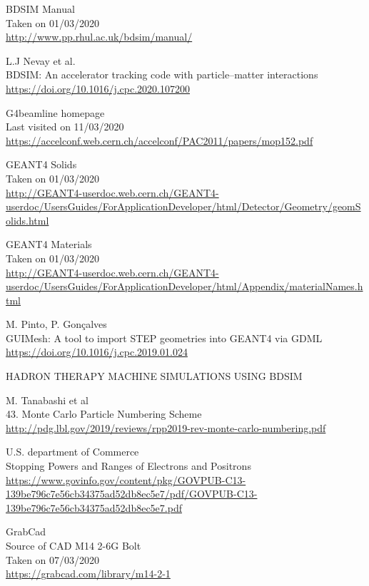 \documentclass[12pt,a4paper]{article}
\begin{document}
\begin{thebibliography}{1}
	\bibitem{}
		BDSIM Manual\\
		Taken on 01/03/2020\\
		\url{http://www.pp.rhul.ac.uk/bdsim/manual/}
		
		L.J Nevay et al.\\
		BDSIM: An accelerator tracking code with particle–matter interactions\\
		\url{https://doi.org/10.1016/j.cpc.2020.107200}

	
	G4beamline homepage\\
	Last visited on 11/03/2020\\
	\url{https://accelconf.web.cern.ch/accelconf/PAC2011/papers/mop152.pdf}
	
		
	GEANT4 Solids\\
	Taken on 01/03/2020\\
	\url{http://GEANT4-userdoc.web.cern.ch/GEANT4-userdoc/UsersGuides/ForApplicationDeveloper/html/Detector/Geometry/geomSolids.html}
	
	GEANT4 Materials\\
	Taken on 01/03/2020\\
	\url{http://GEANT4-userdoc.web.cern.ch/GEANT4-userdoc/UsersGuides/ForApplicationDeveloper/html/Appendix/materialNames.html}
	
	M. Pinto, P. Gon\c{c}alves\\
	GUIMesh: A tool to import STEP geometries into GEANT4 via GDML\\
	\url{https://doi.org/10.1016/j.cpc.2019.01.024}
	
	HADRON THERAPY MACHINE SIMULATIONS USING BDSIM
		
	M. Tanabashi et al\\
	43. Monte Carlo Particle Numbering Scheme\\
	\url{http://pdg.lbl.gov/2019/reviews/rpp2019-rev-monte-carlo-numbering.pdf}
	
	U.S. department of Commerce\\
	Stopping Powers and Ranges of
	Electrons and Positrons\\
	\url{https://www.govinfo.gov/content/pkg/GOVPUB-C13-139be796c7e56cb34375ad52db8ec5e7/pdf/GOVPUB-C13-139be796c7e56cb34375ad52db8ec5e7.pdf}
	
	GrabCad\\
	Source of CAD M14 2-6G Bolt\\
	Taken on 07/03/2020\\
	\url{https://grabcad.com/library/m14-2-1}


\end{thebibliography}
\end{document}
